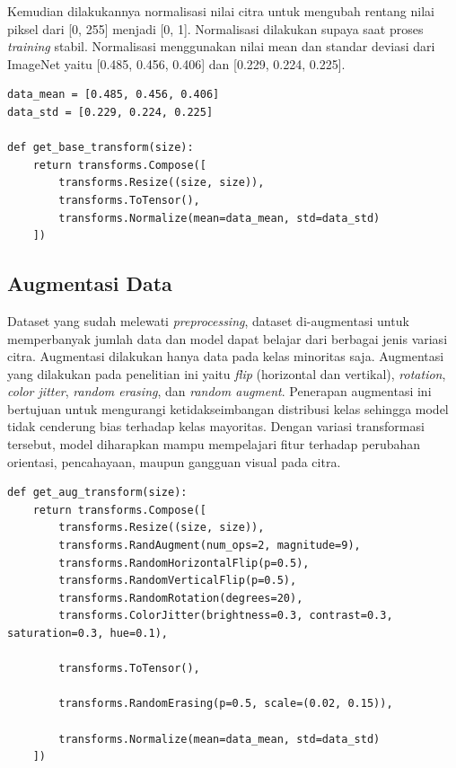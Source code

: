 Kemudian dilakukannya normalisasi nilai citra untuk mengubah rentang nilai 
piksel dari [0, 255] menjadi [0, 1]. Normalisasi dilakukan supaya saat proses 
\textit{training} stabil. Normalisasi menggunakan nilai mean dan standar 
deviasi dari ImageNet yaitu [0.485, 0.456, 0.406] dan [0.229, 0.224, 0.225]. 

\begin{lstlisting}[caption={Kode Normalisasi dan Resize}, label={code:4.kode_normalisasi_resize}]
data_mean = [0.485, 0.456, 0.406]
data_std = [0.229, 0.224, 0.225]

def get_base_transform(size):
    return transforms.Compose([
        transforms.Resize((size, size)),
        transforms.ToTensor(),
        transforms.Normalize(mean=data_mean, std=data_std)
    ])
\end{lstlisting}


\subsection{Augmentasi Data} \label{IV.Augmentasi_Dataset}
Dataset yang sudah melewati \textit{preprocessing}, dataset di-augmentasi 
untuk memperbanyak jumlah data dan model dapat belajar dari berbagai jenis 
variasi citra. Augmentasi dilakukan hanya data pada kelas minoritas saja. 
Augmentasi yang dilakukan pada penelitian ini yaitu \textit{flip} (horizontal 
dan vertikal), \textit{rotation}, \textit{color jitter}, \textit{random erasing}, 
dan \textit{random augment}. Penerapan augmentasi ini bertujuan untuk 
mengurangi ketidakseimbangan distribusi kelas sehingga model tidak 
cenderung bias terhadap kelas mayoritas. Dengan variasi transformasi 
tersebut, model diharapkan mampu mempelajari fitur terhadap perubahan 
orientasi, pencahayaan, maupun gangguan visual pada citra. \par

\begin{lstlisting}[caption={Kode Augmentasi Data}, label={code:4.kode_augmentasi}]
def get_aug_transform(size):
    return transforms.Compose([
        transforms.Resize((size, size)),
        transforms.RandAugment(num_ops=2, magnitude=9),
        transforms.RandomHorizontalFlip(p=0.5),
        transforms.RandomVerticalFlip(p=0.5),
        transforms.RandomRotation(degrees=20),
        transforms.ColorJitter(brightness=0.3, contrast=0.3, saturation=0.3, hue=0.1),

        transforms.ToTensor(),

        transforms.RandomErasing(p=0.5, scale=(0.02, 0.15)),

        transforms.Normalize(mean=data_mean, std=data_std)
    ])
\end{lstlisting}


